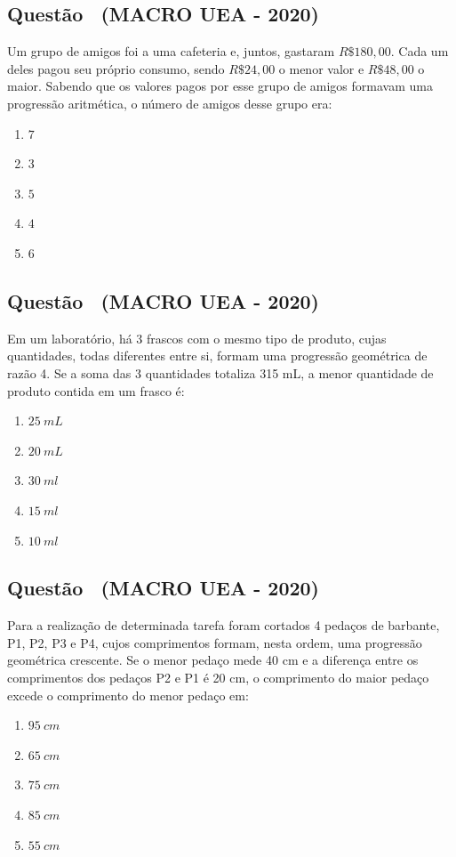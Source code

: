 \documentclass[12pt]{article}
\newcounter{questao}
\newcommand{\novaquestao}[1]{%
  \stepcounter{questao}%
  \subsection*{Questão \thequestao\ (#1)}%
}
\begin{document}
\begin{multicols}{2}
        \novaquestao{MACRO UEA - 2020}
            Um grupo de amigos foi a uma cafeteria e, juntos, gastaram $R\$ 180,00$. Cada um deles pagou seu próprio consumo, sendo $R\$ 24,00$ o menor valor e $R\$ 48,00$ o maior. Sabendo que os valores pagos por esse grupo de amigos formavam uma progressão aritmética, o número de amigos desse grupo era:        
        
            \begin{enumerate}[label=\alph*), noitemsep]
                \item $7$
                \item $3$
                \item $5$
                \item $4$
                \item $6$
            \end{enumerate}
        
        \novaquestao{MACRO UEA - 2020}
            Em um laboratório, há 3 frascos com o mesmo tipo de produto, cujas quantidades, todas diferentes entre si, formam uma progressão geométrica de razão 4. Se a soma das 3 quantidades totaliza 315 mL, a menor quantidade de produto contida em um frasco é:
        
            \begin{enumerate}[label=(\alph*), noitemsep]
                \item $25\ mL$
                \item $20\ mL$
                \item $30\ ml$
                \item $15\ ml$
                \item $10\ ml$
            \end{enumerate}

        \novaquestao{MACRO UEA - 2020}
        
            Para a realização de determinada tarefa foram cortados 4 pedaços de barbante, P1, P2, P3 e P4, cujos comprimentos formam, nesta ordem, uma progressão geométrica crescente. Se o menor pedaço mede 40 cm e a diferença entre os comprimentos dos pedaços P2 e P1 é 20 cm, o comprimento do maior pedaço excede o comprimento do menor pedaço em:

            \begin{enumerate}[label=(\alph*), noitemsep]
                \item $95\ cm$
                \item $65\ cm$
                \item $75\ cm$
                \item $85\ cm$
                \item $55\ cm$
            \end{enumerate}


\end{multicols}
\end{document}
